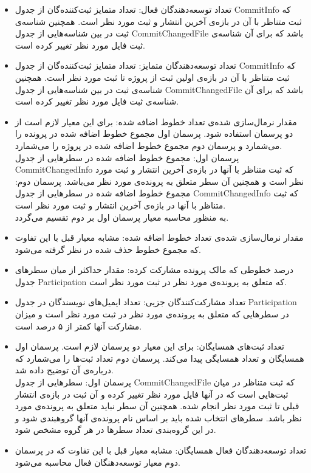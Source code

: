 \begin{itemize}
	\item 
	تعداد توسعه‌دهندگان فعال:  تعداد متمایز ثبت‌کننده‌گان از جدول CommitInfo که ثبت متناظر با آن در بازه‌ی آخرین انتشار و ثبت مورد نظر است. همچنین  شناسه‌ی ثبت در بین شناسه‌هایی از جدول CommitChangedFile باشد که برای آن شناسه‌ی ثبت فایل مورد نظر تغییر کرده است.
	\item
	تعداد توسعه‌دهندگان متمایز: تعداد متمایز ثبت‌کننده‌گان از جدول CommitInfo که ثبت متناظر با آن در بازه‌ی  اولین ثبت از پروژه تا ثبت مورد نظر است. همچنین  شناسه‌ی ثبت در بین شناسه‌هایی از جدول CommitChangedFile باشد که برای آن شناسه‌ی ثبت فایل مورد نظر تغییر کرده است.  
	\item
	مقدار نرمال‌سازی شده‌ی تعداد خطوط اضافه شده: برای این معیار لازم است از دو پرسمان استفاده شود. پرسمان اول مجموع خطوط اضافه شده در پرونده را می‌شمارد و پرسمان دوم مجموع خطوط اضافه شده در پروژه را می‌شمارد.\\
	پرسمان اول: مجموع خطوط اضافه شده در سطرهایی از جدول CommitChangedInfo که ثبت متناظر با آنها در بازه‌ی آخرین انتشار و ثبت مورد نظر است و همچنین آن سطر متعلق به پرونده‌ی مورد نظر می‌باشد. 
	پرسمان دوم: مجموع خطوط اضافه شده در سطرهایی از جدول CommitChangedInfo که ثبت متناظر با آنها در بازه‌ی آخرین انتشار و ثبت مورد نظر است.\\
	به منظور محاسبه معیار پرسمان اول بر دوم تقسیم می‌گردد. 
\item
مقدار نرمال‌سازی شده‌ی تعداد خطوط اضافه شده: مشابه معیار قبل با این تفاوت که مجموع خطوط حذف شده در نظر گرفته می‌شود. 
\item
درصد خطوطی که مالک پرونده مشارکت کرده: مقدار حداکثر از میان سطرهای جدول Participation که متعلق به پرونده‌ی مورد نظر در ثبت مورد نظر است. 
\item 
تعداد مشارکت‌کنندگان جزیی: تعداد ایمیل‌های نویسندگان در جدول Participation در سطرهایی که متعلق به پرونده‌ی مورد نظر در ثبت مورد نظر است و میزان مشارکت آنها کمتر از ۵ درصد است. 
\item
تعداد ثبت‌های همسایگان: برای این معیار دو پرسمان لازم است. پرسمان اول همسایگان و تعداد همسایگی پیدا می‌کند. پرسمان دوم تعداد ثبت‌ها را می‌شمارد که درباره‌ی آن توضیح داده شد. \\
پرسمان اول: سطرهایی از جدول CommitChangedFile که ثبت متناظر در میان ثبت‌هایی است که در آنها فایل مورد نظر تغییر کرده و آن ثبت در بازه‌ی انتشار قبلی تا ثبت مورد نظر انجام شده. همچنین آن سطر نباید متعلق به پرونده‌ی مورد نظر باشد. سطر‌های انتخاب شده باید بر اساس نام پرونده‌ی آنها گروهبندی شود و در این گروه‌بندی تعداد سطر‌ها در هر گروه مشخص شود. 
\item
تعداد توسعه‌دهندگان فعال همسایگان: مشابه معیار قبل با این تفاوت که در پرسمان دوم معیار توسعه‌دهنگان فعال محاسبه می‌شود.

\end{itemize}
